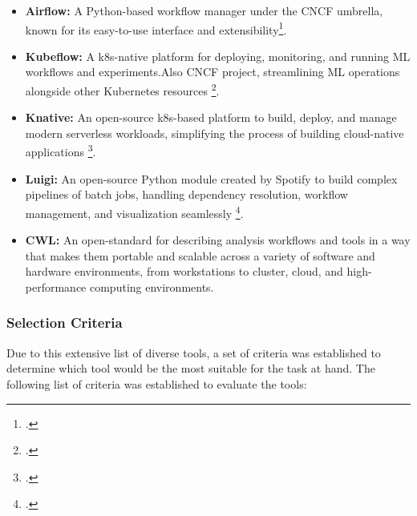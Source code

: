 \begin{itemize}
    \item \textbf{Airflow:} A Python-based workflow manager under the \ac{CNCF} umbrella, known for its easy-to-use interface and extensibility\footcite{hainesWorkflowOrchestrationApache2022}.
    \item \textbf{Kubeflow:} A \ac{k8s}-native platform for deploying, monitoring, and running ML workflows and experiments.Also \ac{CNCF} project, streamlining \ac{ML} operations alongside other Kubernetes resources \footcite{Kubeflow}.
    \item \textbf{Knative:} An open-source \ac{k8s}-based platform to build, deploy, and manage modern serverless workloads, simplifying the process of building cloud-native applications \footcite{HomeKnative}.
    \item \textbf{Luigi:} An open-source Python module created by Spotify to build complex pipelines of batch jobs, handling dependency resolution, workflow management, and visualization seamlessly \footcite{SpotifyLuigi2023}.
    \item \textbf{\ac{CWL}:} An open-standard for describing analysis workflows and tools in a way that makes them portable and scalable across a variety of software and hardware environments, from workstations to cluster, cloud, and high-performance computing environments.
\end{itemize}
    
\subsubsection{Selection Criteria}

Due to this extensive list of diverse tools, a set of criteria was established to determine which tool would be the most suitable for the task at hand.
The following list of criteria was established to evaluate the tools:

